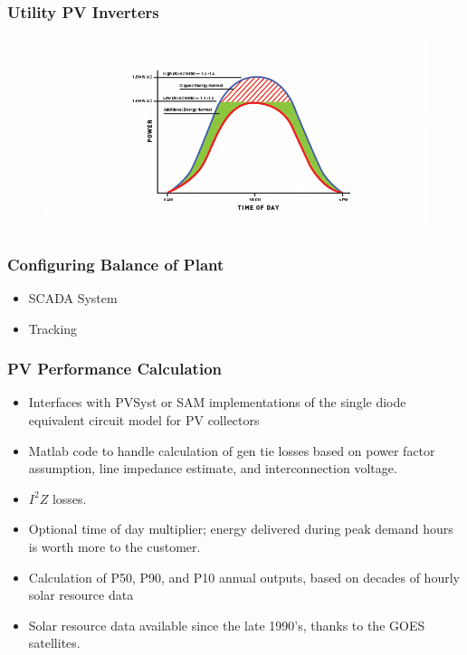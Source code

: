 \documentclass[aspectratio=169]{beamer}
\begin{document}
\begin{frame}
  \frametitle{Utility PV Inverters}
  \begin{figure}
    \includegraphics[width=\linewidth]{Inverter_Clipping.png}
  \end{figure}
\end{frame}


\begin{frame}
  \frametitle{Configuring Balance of Plant}
  \begin{itemize}
    \item SCADA System
    \item Tracking
  \end{itemize}
\end{frame}

\begin{frame}
  \frametitle{PV Performance Calculation}
  \begin{itemize}
    \item Interfaces with PVSyst or SAM implementations of the single
      diode equivalent circuit model for PV collectors
  \item Matlab code to handle calculation of gen tie losses based on
    power factor assumption, line impedance estimate, and
    interconnection voltage.
  \item $I^{2}Z$ losses.
  \item Optional time of day multiplier; energy delivered during peak
    demand hours is worth more to the customer.
  \item Calculation of P50, P90, and P10 annual outputs, based on
    decades of hourly solar resource data
  \item Solar resource data available since the late 1990's, thanks to the GOES satellites. %
  \end{itemize}
\end{frame}
\end{document}
